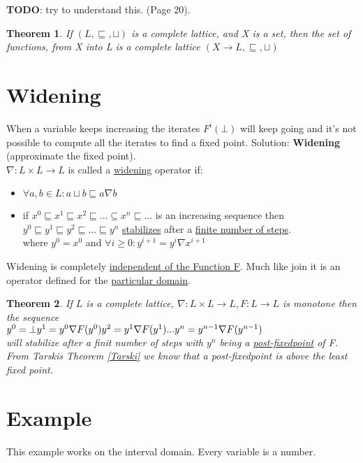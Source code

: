 \textbf{TODO}: try to understand this. (Page 20).

\newtheorem{theorem}{Theorem}
\begin{theorem}
If $(L, \sqsubseteq, \sqcup)$ is a complete lattice, and X is a set, then the set of functions, from X into L is a complete lattice $(X\to L, \sqsubseteq, \sqcup)$
\end{theorem}

\section{Widening}
When a variable keeps increasing the iterates $F^i(\bot)$ will keep going and it's not possible to compute all the iterates to find a fixed point. Solution: \textbf{Widening} (approximate the fixed point).\\
$\nabla:L \times L \to L$ is called a \underline{widening} operator if:
\begin{itemize}
\item $\forall a,b \in L: a \sqcup b \sqsubseteq a \nabla b$
\item if $ x^0 \sqsubseteq x^1 \sqsubseteq x^2 \sqsubseteq ... \subseteq x^n \sqsubseteq ...$ is an increasing sequence then\\ $y^0 \sqsubseteq y^1 \sqsubseteq y^2 \sqsubseteq ... \sqsubseteq y^n$ \underline{stabilizes} after a \underline{finite number of steps}.\\
where $y^0 = x ^ 0$ and $\forall i \geq 0:y^{i+1} = y^i \nabla x^{i+1}$
\end{itemize}
Widening is completely \underline{independent of the Function F}. Much like join it is an operator defined for the \underline{particular domain}.

\begin{theorem}
If $L$ is a complete lattice, $\nabla: L \times L \to L, F: L \to L$ is monotone then the sequence\\
$y^0 = \bot\\y^1 = y^0 \nabla F(y^0)\\y^2 = y^1 \nabla F(y^1)\\ ... \\y^n=y^{n-1} \nabla F(y^{n-1})$\\
will stabilize after a finit number of steps with $y^n$ being a \underline{post-fixedpoint} of F. From Tarskis Theorem \ref{Tarski} we know that a post-fixedpoint is above the least fixed point. 
\end{theorem}

\section{Example}
This example works on the interval domain. Every variable is a number.
